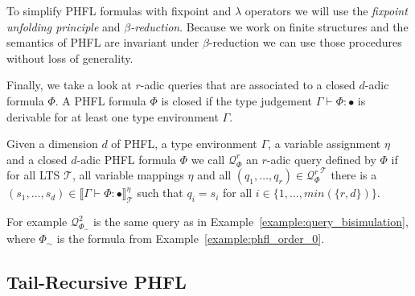 
\begin{remark}
To simplify PHFL formulas with fixpoint and $\lambda$ operators we will use the \emph{fixpoint unfolding principle} and \emph{$\beta$-reduction}. Because we work on finite structures and the semantics of PHFL are invariant under $\beta$-reduction we can use those procedures without loss of generality.
\end{remark}

Finally, we take a look at $r$-adic queries that are associated to a
closed $d$-adic formula $\Phi$. A PHFL formula $\Phi$ is closed if the type judgement $\Gamma \vdash \Phi \colon \bullet$ is derivable for at least one type environment $\Gamma$.

\begin{definition}
\label{definition:query_associated_to_formula}
    Given a dimension $d$ of PHFL, a type environment $\Gamma$, a variable assignment $\eta$ and a closed $d$-adic PHFL
    formula $\Phi$ we call $\mathcal{Q}^r_\Phi$ an $r$-adic query defined by $\Phi$ if for all LTS
    $\mathcal{T}$, all variable mappings $\eta$ and all $(q_1, \dots, q_r) \in {\mathcal{Q}^r_\Phi}^\mathcal{T}$ there is a $(s_1, \dots, s_d) \in
    \llbracket \Gamma \vdash \Phi \colon \bullet \rrbracket^\eta_\mathcal{T}$ such that $q_i = s_i$ for all $i \in
    \{1, \dots, min(\{r, d\})\}$.
\end{definition}

For example $\mathcal{Q}^2_{\Phi_\sim}$ is the same query as in Example~\ref{example:query_bisimulation}, where
$\Phi_\sim$ is the formula from Example~\ref{example:phfl_order_0}.

\subsection{Tail-Recursive PHFL}\label{subsec:tail-recursivePhfl}


